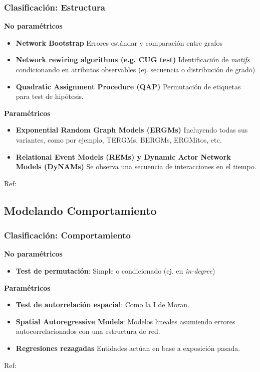 \documentclass[aspectratio=169,10pt]{beamer}
\begin{document}
\begin{frame}
	\frametitle{Clasificación: Estructura}
\pause
	\textbf{No paramétricos}
	\begin{itemize}
		\item \textbf{Network Bootstrap} Errores estándar y comparación entre grafos
		\item \textbf{Network rewiring algorithms (e.g. CUG test)} Identificación de \textit{motifs} condicionando en atributos observables (ej. secuencia o distribución de grado)
		\item \textbf{Quadratic Assignment Procedure (QAP)} Permutación de etiquetas para test de hipótesis.
	\end{itemize}\pause	
	
	\textbf{Paramétricos}

	\begin{itemize}
		\item \textbf{Exponential Random Graph Models (ERGMs)} Incluyendo todas sus variantes, como por ejemplo, TERGMs, BERGMs, ERGMitos, etc.
		\item \textbf{Relational Event Models (REMs) y Dynamic Actor Network Models (DyNAMs)} Se observa una secuencia de interacciones en el tiempo.
	\end{itemize}

Ref: \textcite{Snijders1999,Butts2008b,Krackhardt1988,Robins2007,VegaYon2021,Caimo2014,Butts2008,Stadtfeld2017}
	
\end{frame}

\subsection{Modelando Comportamiento}

\begin{frame}
	\frametitle{Clasificación: Comportamiento}
\pause	
	\textbf{No paramétricos}
	\begin{itemize}
		\item \textbf{Test de permutación}: Simple o condicionado (ej. en \textit{in-degree})
	\end{itemize}
\pause
	\textbf{Paramétricos}
	\begin{itemize}
		\item \textbf{Test de autorrelación espacial}: Como la I de Moran.
		\item \textbf{Spatial Autoregressive Models}: Modelos lineales asumiendo errores autocorrelacionados con una estructura de red.
		\item \textbf{Regresiones rezagadas} Entidades actúan en base a exposición pasada.
	\end{itemize}

Ref: \textcite{Butts2008b,Moran1950,LeSage2008,Valente2019}

\end{frame}
\end{document}
